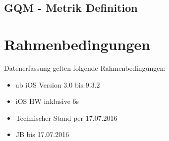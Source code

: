 \subsection{GQM - Metrik Definition}
\label{sec:GQMMetrik}

\section{Rahmenbedingungen}
\label{sec:Rahmenbedingungen}
Datenerfassung gelten folgende Rahmenbedingungen:
\begin{itemize}
    \item ab iOS Version 3.0 bis 9.3.2
    \item iOS HW inklusive 6s
    \item Technischer Stand per 17.07.2016
    \item JB bis 17.07.2016
\end{itemize}






    
